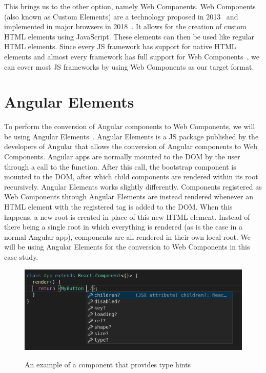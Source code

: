 This brings us to the other option, namely Web Components. Web Components (also known as Custom Elements) are a technology proposed in 2013~ and implemented in major browsers in 2018~. It allows for the creation of custom HTML elements using JavaScript. These elements can then be used like regular HTML elements. Since every JS framework has support for native HTML elements and almost every framework has full support for Web Components~, we can cover most JS frameworks by using Web Components as our target format.

\section{Angular Elements}\label{sec:bg:angularelements}
To perform the conversion of Angular components to Web Components, we will be using Angular Elements~. Angular Elements is a JS package published by the developers of Angular that allows the conversion of Angular components to Web Components. Angular apps are normally mounted to the DOM by the user through a call to the  function. After this call, the bootstrap component is mounted to the DOM, after which child components are rendered within its root recursively. Angular Elements works slightly differently. Components registered as Web Components through Angular Elements are instead rendered whenever an HTML element with the registered tag is added to the DOM\@. When this happens, a new root is created in place of this new HTML element. Instead of there being a single root in which everything is rendered (as is the case in a normal Angular app), components are all rendered in their own local root. We will be using Angular Elements for the conversion to Web Components in this case study.

\begin{figure}[h]
	\caption{An example of a component that provides type hints}
	\includegraphics[width=\columnwidth]{figures/background/hinting.png}
	\label{fig:bg:hinting}
	\centering
\end{figure}

